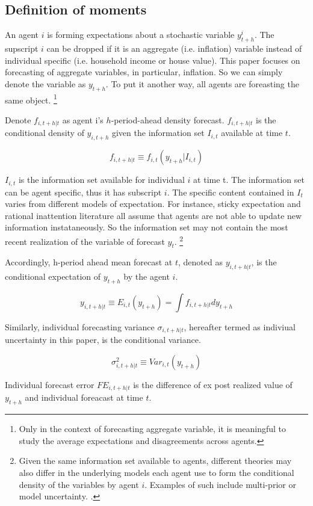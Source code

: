 \documentclass[]{article}
\begin{document}
\subsection{Definition of moments}

An agent $i$ is forming expectations about a stochastic variable $y^i_{t+h}$. The supscript $i$ can be dropped if it is an aggregate (i.e. inflation) variable instead of individual specific  (i.e. household income or house value). This paper focuses on forecasting of aggregate variables, in particular, inflation. So we can simply denote the variable as $y_{t+h}$. To put it another way, all agents are foreasting the same object. \footnote{Only in the context of forecasting aggregate variable, it is meaningful to study the average expectations and disagreements across agents.}

Denote $ f_{i,t+h|t}$ as agent i's $h$-period-ahead density forecast. $ f_{i,t+h|t}$ is the conditional density of $y_{i,t+h}$ given the information set $I_{i,t}$ available at time $t$. 

$$f_{i,t+h|t} \equiv f_{i,t}(y_{t+h}|I_{i,t})$$


$I_{i,t}$ is the information set available for individual $i$ at time t. The information set can be  agent specific, thus it has subscript $i$.  The specific content contained in $I_t$ varies from different models of expectation. For instance, sticky expectation and rational inattention literature all assume that agents are not able to update new information instataneously. So the information set may not contain the most recent realization of the variable of forecast $y_t$. \footnote{Given the same information set available to agents, different theories may also differ in the underlying models each agent use to form the conditional density of the variables by agent $i$. Examples of such include multi-prior or model uncertainty. \cite{xx}. }

Accordingly, h-period ahead mean forecast at $t$, denoted as $ y_{i,t+h|t}$, is the conditional expectation of $y_{t+h}$ by the agent $i$. 

$$y_{i,t+h|t} \equiv E_{i,t}(y_{t+h}) =\int f_{i, t+h|t} d y_{t+h}$$

Similarly, individual forecasting variance $\sigma_{i,t+h|t}$, hereafter termed as indiviual uncertainty in this paper, is the conditional variance.

$$\sigma^2_{i,t+h|t} \equiv Var_{i,t}( y_{t+h} )$$

Individual forecast error $FE_{i,t+h|t}$ is the difference of ex post realized value of $y_{t+h}$ and individual foreacast at time $t$. 
\end{document}
